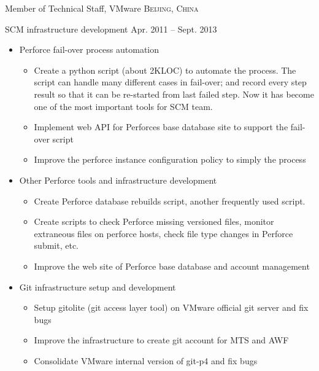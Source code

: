 \documentclass[10pt,letterpaper]{article}
\begin{document}
\headedsection
{Member of Technical Staff, VMware}
{\textsc{Beijing, China}}{

\headedsubsection %
{SCM infrastructure development} {Apr. 2011 -- Sept. 2013}
{
    \begin{itemize}
        \item Perforce fail-over process automation
            \begin{itemize}
                \item Create a python script (about 2KLOC) to automate the
                    process.  The script can handle many different cases in
                    fail-over; and record every step result so that it can be
                    re-started from last failed step. Now it has become one of
                    the most important tools for SCM team.
                \item Implement web API for Perforces base database site to support the
                    fail-over script
                \item Improve the perforce instance configuration policy to simply the
                    process
            \end{itemize}
        \item Other Perforce tools and infrastructure development
            \begin{itemize}
                \item   Create Perforce database rebuilds script, another frequently used
                    script.
                \item   Create scripts to check Perforce missing versioned files, monitor
                    extraneous files on perforce hosts, check file type changes in Perforce
                    submit, etc.
                \item   Improve the web site of Perforce base database and account management
            \end{itemize}
        \item Git infrastructure setup and development
            \begin{itemize}
                \item   Setup gitolite (git access layer tool) on VMware official git server
                    and fix bugs
                \item   Improve the infrastructure to create git account for MTS and AWF
                \item   Consolidate VMware internal version of git-p4 and fix bugs

\end{itemize}
\end{itemize}}}
\end{document}
